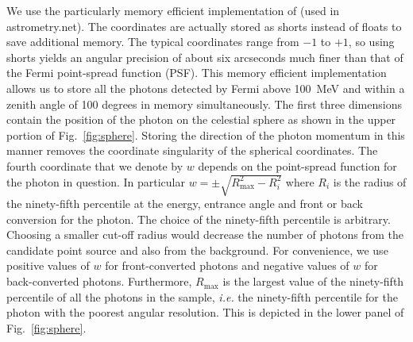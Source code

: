 \documentclass[useAMS,usenatbib]{mn2e}
\begin{document}
We use the particularly memory efficient implementation of
\citet{LangPhD} (used in astrometry.net).  The coordinates are
actually stored as shorts instead of floats to save additional memory.
The typical coordinates range from $-1$ to $+1$, so using shorts
yields an angular precision of about six arcseconds much finer than
that of the Fermi point-spread function (PSF). This memory efficient
implementation allows us to store all the photons detected by Fermi
above 100~MeV and within a zenith angle of 100 degrees in memory
simultaneously.  The first three dimensions contain the position of
the photon on the celestial sphere as shown in the upper portion of
Fig.~\ref{fig:sphere}.  Storing the direction of the photon momentum
in this manner removes the coordinate singularity of the spherical
coordinates.
The fourth
coordinate that we denote by $w$ depends on the point-spread function
for the photon in question.  In particular $w=\pm
\sqrt{R^2_\mathrm{max}-R_i^2}$ where $R_i$ is the radius of the
ninety-fifth percentile at the energy, entrance angle and front or
back conversion for the photon.  The choice of the ninety-fifth
percentile is arbitrary.  Choosing a smaller cut-off radius would
decrease the number of photons from the candidate point source and also
from the background.  For convenience, we use positive values of $w$
for front-converted photons and negative values of $w$ for
back-converted photons.  Furthermore, $R_\mathrm{max}$ is the largest
value of the ninety-fifth percentile of all the photons in the sample,
{\em i.e.} the ninety-fifth percentile for the photon with the poorest
angular resolution.  This is depicted in the lower panel of
Fig.~\ref{fig:sphere}.
\end{document}
